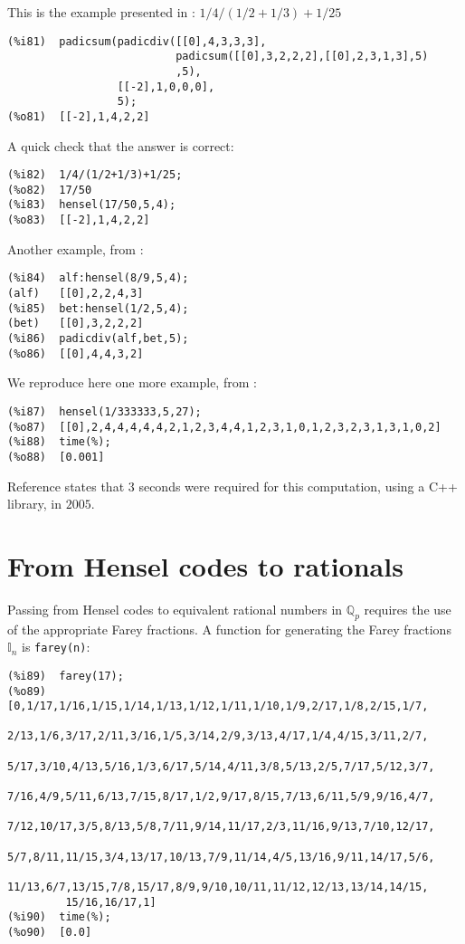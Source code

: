 \documentclass[fleqn]{cas-sc}
\begin{document}
This is the example presented in \cite{3}: $1/4/(1/2+1/3)+1/25$
\begin{verbatim}
(%i81)	padicsum(padicdiv([[0],4,3,3,3],
                          padicsum([[0],3,2,2,2],[[0],2,3,1,3],5)
                          ,5),
                 [[-2],1,0,0,0],
                 5);
(%o81)	[[-2],1,4,2,2]
\end{verbatim}

A quick check that the answer is correct:
\begin{verbatim}
(%i82)	1/4/(1/2+1/3)+1/25;
(%o82)	17/50
(%i83)	hensel(17/50,5,4);
(%o83)	[[-2],1,4,2,2]
\end{verbatim}

Another example, from \cite{4}:
\begin{verbatim}
(%i84)	alf:hensel(8/9,5,4);
(alf)	[[0],2,2,4,3]
(%i85)	bet:hensel(1/2,5,4);
(bet)	[[0],3,2,2,2]
(%i86)	padicdiv(alf,bet,5);
(%o86)	[[0],4,4,3,2]
\end{verbatim}

We reproduce here one more example, from \cite{6}:
\begin{verbatim}
(%i87)	hensel(1/333333,5,27);
(%o87)	[[0],2,4,4,4,4,4,2,1,2,3,4,4,1,2,3,1,0,1,2,3,2,3,1,3,1,0,2]
(%i88)	time(%);
(%o88)	[0.001]
\end{verbatim}

Reference \cite{6} states that $3$ seconds were required for this computation,
using a C++ library, in $2005$.

\section{From Hensel codes to rationals}\label{sec5}

\noindent Passing from Hensel codes to equivalent rational numbers in $\mathbb{Q}_p$
requires the use of the appropriate Farey fractions. A function for
generating the Farey fractions $\mathbb{I}_n$ is \texttt{farey(n)}:
\begin{verbatim}
(%i89)	farey(17);
(%o89)	[0,1/17,1/16,1/15,1/14,1/13,1/12,1/11,1/10,1/9,2/17,1/8,2/15,1/7,
         2/13,1/6,3/17,2/11,3/16,1/5,3/14,2/9,3/13,4/17,1/4,4/15,3/11,2/7,
         5/17,3/10,4/13,5/16,1/3,6/17,5/14,4/11,3/8,5/13,2/5,7/17,5/12,3/7,
         7/16,4/9,5/11,6/13,7/15,8/17,1/2,9/17,8/15,7/13,6/11,5/9,9/16,4/7,
         7/12,10/17,3/5,8/13,5/8,7/11,9/14,11/17,2/3,11/16,9/13,7/10,12/17,
         5/7,8/11,11/15,3/4,13/17,10/13,7/9,11/14,4/5,13/16,9/11,14/17,5/6,
         11/13,6/7,13/15,7/8,15/17,8/9,9/10,10/11,11/12,12/13,13/14,14/15,
         15/16,16/17,1]
(%i90)	time(%);
(%o90)	[0.0]
\end{verbatim}
\end{document}

